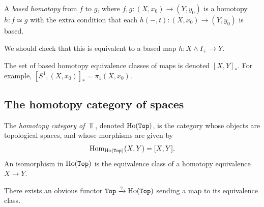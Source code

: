 \documentclass{article}[11pt]
\newcommand{\smashprod}{\wedge} %
\begin{document}
\begin{definition}\label{def:based-homotopy} A \textit{based homotopy} from $f$ to $g$, where $f,g : (X,x_0) \to (Y,y_0)$ is a homotopy $h:f\simeq g$ with the extra condition that each $h(-,t) : (X,x_0) \to (Y,y_0)$ is based.

We should check that this is equivalent to a based map $h : X \smashprod I_+ \to Y$.
\end{definition}

\begin{notation} The set of based homotopy equivalence classes of maps is denoted $[X,Y]_\ast$. For example, $[S^1, (X,x_0)]_\ast = \pi_1(X,x_0)$.
\end{notation}






\subsection{The homotopy category of spaces}
\begin{definition} The \textit{homotopy category of $\Top$}, denoted $\text{Ho}(\texttt{Top})$, is the category whose objects are topological spaces, and whose morphisms are given by
\begin{align*}
	\textup{Hom}_{\text{Ho}(\texttt{Top})} (X,Y) = [X,Y].
\end{align*}
An isomorphism in $\text{Ho}(\texttt{Top})$ is the equivalence class of a homotopy equivalence $X\to Y$.
\end{definition}

There exists an obvious functor $\texttt{Top} \xrightarrow{\gamma} \text{Ho}(\texttt{Top})$ sending a map to its equivalence class.
\end{document}
